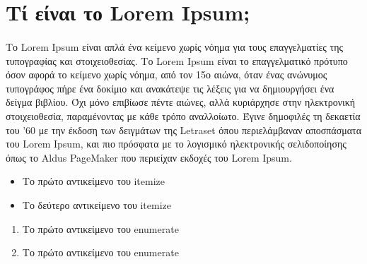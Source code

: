 \section{Τί είναι το Lorem Ipsum;}
    \paragraph{}Το Lorem Ipsum είναι απλά ένα κείμενο χωρίς νόημα για τους επαγγελματίες της τυπογραφίας και στοιχειοθεσίας.
    Το Lorem Ipsum είναι το επαγγελματικό πρότυπο όσον αφορά το κείμενο χωρίς νόημα, από τον 15ο αιώνα, όταν ένας ανώνυμος
    τυπογράφος πήρε ένα δοκίμιο και ανακάτεψε τις λέξεις για να δημιουργήσει ένα δείγμα βιβλίου. Όχι μόνο επιβίωσε πέντε αιώνες,
    αλλά κυριάρχησε στην ηλεκτρονική στοιχειοθεσία, παραμένοντας με κάθε τρόπο αναλλοίωτο. Έγινε δημοφιλές τη δεκαετία του '60
    με την έκδοση των δειγμάτων της Letraset όπου περιελάμβαναν αποσπάσματα του Lorem Ipsum, και πιο πρόσφατα με το λογισμικό
    ηλεκτρονικής σελιδοποίησης όπως το Aldus PageMaker που περιείχαν εκδοχές του Lorem Ipsum. \cite{article-full}

    \begin{itemize}
        \item Το πρώτο αντικείμενο του itemize
        \item Το δεύτερο αντικείμενο του itemize
    \end{itemize}
    
    \begin{enumerate}
        \item Το πρώτο αντικείμενο του enumerate
        \item Το πρώτο αντικείμενο του enumerate
    \end{enumerate}
    
\newpage
